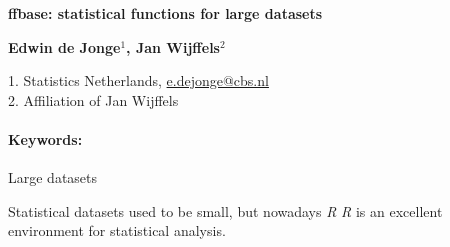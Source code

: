 \documentclass[11pt, a4paper]{article}
\newcommand{\pkg}[1]{{\normalfont\fontseries{b}\selectfont #1}}
\let\proglang=\textit
\let\code=\texttt
\renewcommand{\title}[1]{\begin{center}{\bf \LARGE #1}\end{center}}
\newcommand{\keywords}{\paragraph{Keywords:}}
\begin{document}
\pagestyle{empty}

\title{\pkg{ffbase}: statistical functions for large datasets}

\begin{center}
  {\bf Edwin de Jonge$^{1}$, Jan Wijffels$^{2}$}
\end{center}

\begin{affiliations}
1. Statistics Netherlands,  \href{mailto:e.dejonge@cbs.nl}{e.dejonge@cbs.nl} \\[-2pt]
2. Affiliation of Jan Wijffels \\[-2pt]
\end{affiliations}

\keywords Large datasets

\vskip 0.8cm

Statistical datasets used to be small, but nowadays \proglang{R}
\proglang{R} is an excellent environment for statistical analysis.



% 

\nocite{ref1,ref2,ref3}






\end{document}
